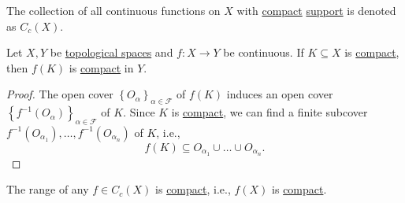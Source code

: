 \begin{notation}
	The collection of all continuous functions on \(X\) with \hyperref[def:compact]{compact} \hyperref[def:support]{support} is denoted as \(C_c(X)\).
\end{notation}

\begin{theorem}\label{thm:continuous-image-of-compact-is-compact}
	Let \(X, Y\) be \hyperref[def:topological-space]{topological spaces} and \(f\colon X \to Y\) be continuous. If \(K \subseteq X\) is \hyperref[def:compact]{compact}, then \(f(K)\) is \hyperref[def:compact]{compact} in \(Y\).
\end{theorem}
\begin{proof}
	The open cover \(\left\{ O_\alpha  \right\}_{\alpha \in \mathcal{F} } \) of \(f(K)\) induces an open cover \(\left\{ f^{-1} (O_\alpha ) \right\}_{\alpha \in \mathcal{F} } \) of \(K\). Since \(K\) is \hyperref[def:compact]{compact}, we can find a finite subcover \(f^{-1} (O_{\alpha _1}), \ldots , f^{-1} (O_{\alpha _n}) \) of \(K\), i.e.,
	\[
		f(K) \subseteq O_{\alpha _1} \cup \ldots \cup O_{\alpha _n}.
	\]
\end{proof}

\begin{remark}
	The range of any \(f\in C_c(X)\) is \hyperref[def:compact]{compact}, i.e., \(f(X)\) is \hyperref[def:compact]{compact}.
\end{remark}

